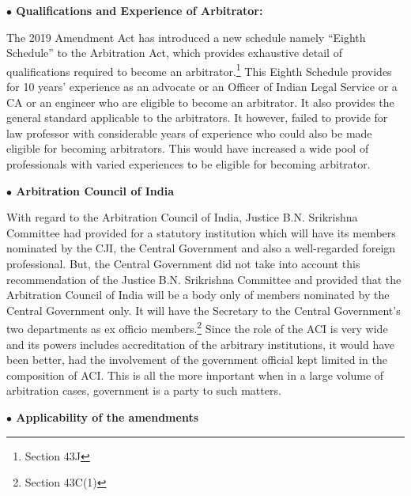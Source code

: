 \begin{multicols}{2}
\noi
{\large \bfseries $\bullet$ Qualifications and Experience of Arbitrator:}

\noi
The 2019 Amendment Act has introduced a new schedule namely “Eighth Schedule” to the
Arbitration Act, which provides exhaustive detail of qualifications required to become an
arbitrator.\footnote{Section 43J} This Eighth Schedule provides for 10 years’ experience as an advocate or an
Officer of Indian Legal Service or a CA or an engineer who are eligible to become an
arbitrator. It also provides the general standard applicable to the arbitrators. It however, failed
to provide for law professor with considerable years of experience who could also be made
eligible for becoming arbitrators. This would have increased a wide pool of professionals
with varied experiences to be eligible for becoming arbitrator.


\noi
{\large \bfseries $\bullet$ Arbitration Council of India}

\noi
With regard to the Arbitration Council of India, Justice B.N. Srikrishna Committee had
provided for a statutory institution which will have its members nominated by the CJI, the
Central Government and also a well-regarded foreign professional. But, the Central
Government did not take into account this recommendation of the Justice B.N. Srikrishna
Committee and provided that the Arbitration Council of India will be a body only of
members nominated by the Central Government only. It will have the Secretary to the
Central Government’s two departments as ex officio members.\footnote{Section 43C(1)} Since the role of the ACI is
very wide and its powers includes accreditation of the arbitrary institutions, it would have
been better, had the involvement of the government official kept limited in the composition
of ACI. This is all the more important when in a large volume of arbitration cases,
government is a party to such matters.

\noi
{\large \bfseries $\bullet$ Applicability of the amendments}


\end{multicols}
